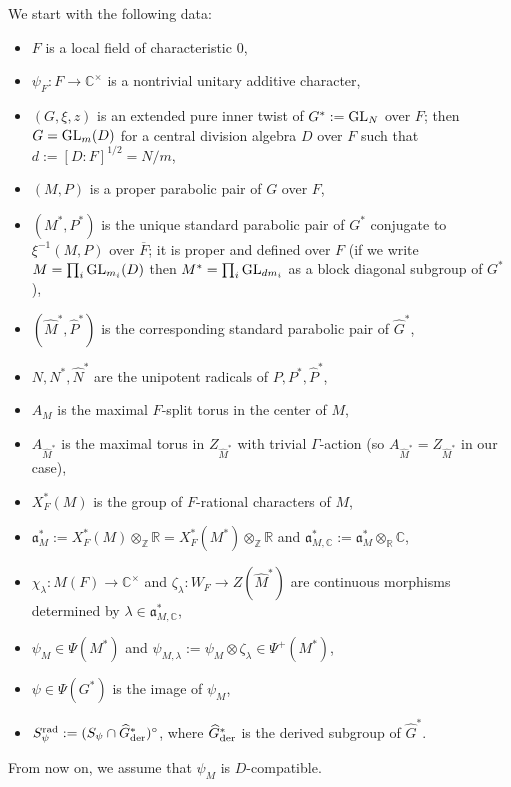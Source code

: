 \documentclass[11pt,reqno]{amsart}
\theoremstyle{plain}
\theoremstyle{definition}
\newcommand{\fka}{{\mathfrak a}}
\newcommand{\Z}{\mathbb{Z}}
\newcommand{\C}{\mathbb{C}}
\newcommand{\R}{\mathbb{R}}
\newcommand{\GL}{\tu{GL}}
\newcommand{\tu}{\textup}
\newcommand{\ol}{\overline}
\renewcommand{\hat}{\widehat}
\numberwithin{equation}{subsection}
\begin{document}
We start with the following data:
\begin{itemize}
    \item $F$ is a local field of characteristic $0$,
    \item $\psi_F\colon F\to \C^\times$ is a nontrivial unitary additive character,
    \item $(G,\xi,z)$ is an extended pure inner twist of $G^*:=\GL_N$ over $F$; then $G=\GL_m(D)$ for a central division algebra $D$ over $F$ such that $d:=[D:F]^{1/2}=N/m$,
    \item $(M,P)$ is a proper parabolic pair of $G$ over $F$,
    \item $(M^*,P^*)$ is the unique standard parabolic pair of $G^*$ conjugate to $\xi^{-1}(M,P)$ over $\ol F$; it is proper and defined over $F$ (if we write $M=\prod_i \GL_{m_i}(D)$ then $M^*=\prod_i \GL_{dm_i}$ as a block diagonal subgroup of $G^*$),
    \item $(\hat M^*,\hat P^*)$ is the corresponding standard parabolic pair of $\hat G^*$,
    \item $N,N^*,\hat N^*$ are the unipotent radicals of $P,P^*,\hat P^*$,
    \item $A_M$ is the maximal $F$-split torus in the center of $M$,
    \item $A_{\hat M^*}$ is the maximal torus in $Z_{\hat M^*}$ with trivial $\Gamma$-action (so $A_{\hat M^*}=Z_{\hat M^*}$ in our case),
    \item $X^*_F(M)$ is the group of $F$-rational characters of $M$,
    \item $\fka_M^*:=X^*_F(M)\otimes_{\Z}\R=X^*_F(M^*)\otimes_{\Z}\R$ and $\fka_{M,\C}^*:=\fka_M^*\otimes_{\R}\C$,
    \item $\chi_\lambda\colon M(F)\to \C^\times$ and $\zeta_\lambda\colon W_F\to Z(\hat M^*)$ are continuous morphisms determined by $\lambda\in \fka_{M,\C}^*$,
    \item $\psi_M\in \Psi(M^*)$ and $\psi_{M,\lambda}:=\psi_M\otimes \zeta_\lambda\in \Psi^+(M^*)$,
    \item $\psi\in \Psi(G^*)$ is the image of $\psi_M$, 
        \item $S_\psi^{\tu{rad}}:=(S_\psi\cap \hat{G}^*_{\tu{der}})^\circ$, where $\hat{G}^*_{\tu{der}}$ is the derived subgroup of $\hat G^*$. 
    \end{itemize}
    
    From now on, we assume that $\psi_M$ is $D$-compatible.
    
\end{document}
